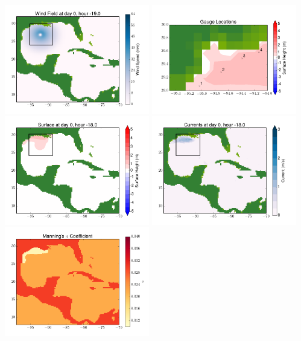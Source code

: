 \documentclass[11pt]{article}
\begin{document}
\vskip 10pt 
\includegraphics[width=0.475\textwidth]{frame0053fig9.png}
\includegraphics[width=0.475\textwidth]{frame0053fig10.png}
\vskip 10pt 
\includegraphics[width=0.475\textwidth]{frame0054fig1.png}
\includegraphics[width=0.475\textwidth]{frame0054fig2.png}
\vskip 10pt 
\includegraphics[width=0.475\textwidth]{frame0054fig3.png}
\end{document}

